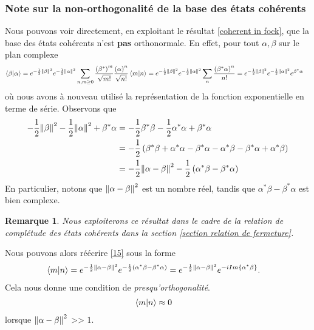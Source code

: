 \documentclass[11pt,oneside,a4paper]{article}
\newtheorem{remark}[theorem]{Remarque}
\begin{document}
\subsubsection{Note sur la non-orthogonalité de la base des états cohérents}
Nous pouvons voir directement, en exploitant le résultat \ref{coherent in fock}, que la base des états cohérents n'est \textbf{pas} orthonormale. En effet, pour tout $\alpha,\beta$ sur le plan complexe
\begin{align}
  \braket{\beta}{\alpha} &= e^{-\frac{1}{2}\norm{\beta}^2}e^{-\frac{1}{2}\norm{\alpha}^2}\sum_{n,m\geq 0}\frac{\left(\beta^*\right)^m}{\sqrt{m!}}\frac{\left(\alpha\right)^n}{\sqrt{n!}}\braket{m}{n}
  = e^{-\frac{1}{2}\norm{\beta}^2}e^{-\frac{1}{2}\norm{\alpha}^2} \sum_n \frac{\left(\beta^*\alpha\right)^n}{n!} = e^{-\frac{1}{2}\norm{\beta}^2}e^{-\frac{1}{2}\norm{\alpha}^2}e^{\beta^*\alpha}\label{15}
\end{align}
où nous avons à nouveau utilisé la représentation de la fonction exponentielle en terme de série. Observons que 
\begin{align}
  -\frac{1}{2}\norm{\beta}^2-\frac{1}{2}\norm{\alpha}^2+\beta^*\alpha &= -\frac{1}{2}\beta^*\beta - \frac{1}{2}\alpha^*\alpha+\beta^*\alpha\\
  &= -\frac{1}{2}\left(\beta^*\beta+\alpha^*\alpha-\beta^*\alpha-\alpha^*\beta-\beta^*\alpha+\alpha^*\beta\right)\\
  &= -\frac{1}{2}\norm{\alpha-\beta}^2-\frac{1}{2}\left(\alpha^*\beta-\beta^*\alpha\right)
\end{align}
En particulier, notons que $\norm{\alpha-\beta}^2$ est un nombre réel, tandis que $\alpha^*\beta-\beta^*\alpha$ est bien complexe. 

\begin{remark}
  Nous exploiterons ce résultat dans le cadre de la relation de complétude des états cohérents dans la section \ref{section relation de fermeture}.
\end{remark}

Nous pouvons alors réécrire \eqref{15} sous la forme
\begin{align}
  \braket{m}{n} &= e^{-\frac{1}{2}\norm{\alpha-\beta}^2}e^{-\frac{1}{2}\left(\alpha^*\beta-\beta^*\alpha\right)} = e^{-\frac{1}{2}\norm{\alpha-\beta}^2}e^{-iIm\left\{\alpha^*\beta\right\}}.
\end{align}
Cela nous donne une condition de \emph{presqu'orthogonalité}.
\begin{align}
  \braket{m}{n} &\approx 0
\end{align}
lorsque $\norm{\alpha-\beta}^2$ >> $1$.
\end{document}
